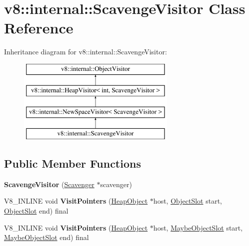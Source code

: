 \hypertarget{classv8_1_1internal_1_1ScavengeVisitor}{}\section{v8\+:\+:internal\+:\+:Scavenge\+Visitor Class Reference}
\label{classv8_1_1internal_1_1ScavengeVisitor}
Inheritance diagram for v8\+:\+:internal\+:\+:Scavenge\+Visitor\+:\begin{figure}[H]
\begin{center}
\leavevmode
\includegraphics[height=4.000000cm]{classv8_1_1internal_1_1ScavengeVisitor}
\end{center}
\end{figure}
\subsection*{Public Member Functions}
\begin{DoxyCompactItemize}
\item 
\mbox{\label{classv8_1_1internal_1_1ScavengeVisitor_a400905f58d82b48bf8d6cc690f377fb2}} 
{\bfseries Scavenge\+Visitor} (\mbox{\hyperlink{classv8_1_1internal_1_1Scavenger}{Scavenger}} $\ast$scavenger)
\item 
\mbox{\label{classv8_1_1internal_1_1ScavengeVisitor_a07520bc99f74879dfda057085d0da59a}} 
V8\+\_\+\+I\+N\+L\+I\+NE void {\bfseries Visit\+Pointers} (\mbox{\hyperlink{classv8_1_1internal_1_1HeapObject}{Heap\+Object}} $\ast$host, \mbox{\hyperlink{classv8_1_1internal_1_1ObjectSlot}{Object\+Slot}} start, \mbox{\hyperlink{classv8_1_1internal_1_1ObjectSlot}{Object\+Slot}} end) final
\item 
\mbox{\label{classv8_1_1internal_1_1ScavengeVisitor_a19dc65a9b0f7dd74b0bf33d3a5987ac0}} 
V8\+\_\+\+I\+N\+L\+I\+NE void {\bfseries Visit\+Pointers} (\mbox{\hyperlink{classv8_1_1internal_1_1HeapObject}{Heap\+Object}} $\ast$host, \mbox{\hyperlink{classv8_1_1internal_1_1MaybeObjectSlot}{Maybe\+Object\+Slot}} start, \mbox{\hyperlink{classv8_1_1internal_1_1MaybeObjectSlot}{Maybe\+Object\+Slot}} end) final
\end{DoxyCompactItemize}
